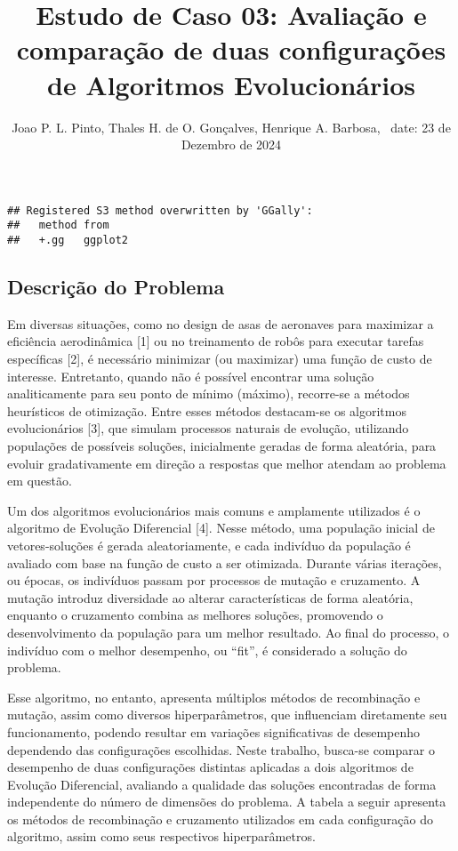 \documentclass[
]{article}
\title{Estudo de Caso 03: Avaliação e comparação de duas configurações
de Algoritmos Evolucionários}
\author{Joao P. L. Pinto, Thales H. de O. Gonçalves, Henrique A.
Barbosa, ~date: 23 de Dezembro de 2024}
\date{}
\begin{document}
\maketitle

\begin{verbatim}
## Registered S3 method overwritten by 'GGally':
##   method from   
##   +.gg   ggplot2
\end{verbatim}

\hypertarget{descriuxe7uxe3o-do-problema}{%
\subsection{Descrição do Problema}\label{descriuxe7uxe3o-do-problema}}

Em diversas situações, como no design de asas de aeronaves para
maximizar a eficiência aerodinâmica {[}1{]} ou no treinamento de robôs
para executar tarefas específicas {[}2{]}, é necessário minimizar (ou
maximizar) uma função de custo de interesse. Entretanto, quando não é
possível encontrar uma solução analiticamente para seu ponto de mínimo
(máximo), recorre-se a métodos heurísticos de otimização. Entre esses
métodos destacam-se os algoritmos evolucionários {[}3{]}, que simulam
processos naturais de evolução, utilizando populações de possíveis
soluções, inicialmente geradas de forma aleatória, para evoluir
gradativamente em direção a respostas que melhor atendam ao problema em
questão.

Um dos algoritmos evolucionários mais comuns e amplamente utilizados é o
algoritmo de Evolução Diferencial {[}4{]}. Nesse método, uma população
inicial de vetores-soluções é gerada aleatoriamente, e cada indivíduo da
população é avaliado com base na função de custo a ser otimizada.
Durante várias iterações, ou épocas, os indivíduos passam por processos
de mutação e cruzamento. A mutação introduz diversidade ao alterar
características de forma aleatória, enquanto o cruzamento combina as
melhores soluções, promovendo o desenvolvimento da população para um
melhor resultado. Ao final do processo, o indivíduo com o melhor
desempenho, ou ``fit'', é considerado a solução do problema.

Esse algoritmo, no entanto, apresenta múltiplos métodos de recombinação
e mutação, assim como diversos hiperparâmetros, que influenciam
diretamente seu funcionamento, podendo resultar em variações
significativas de desempenho dependendo das configurações escolhidas.
Neste trabalho, busca-se comparar o desempenho de duas configurações
distintas aplicadas a dois algoritmos de Evolução Diferencial, avaliando
a qualidade das soluções encontradas de forma independente do número de
dimensões do problema. A tabela a seguir apresenta os métodos de
recombinação e cruzamento utilizados em cada configuração do algoritmo,
assim como seus respectivos hiperparâmetros.
\end{document}
